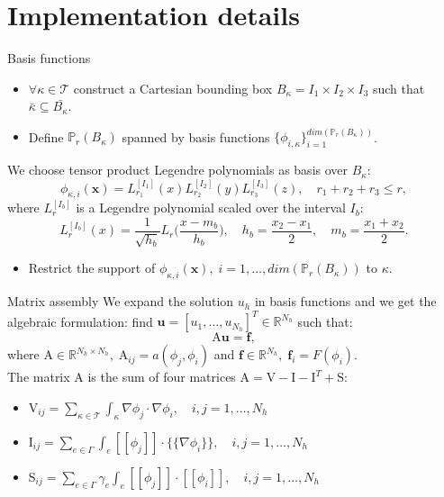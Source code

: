 \documentclass{beamer}
\begin{document}
\section{Implementation details}
\begin{frame}{Basis functions}
	\begin{itemize}
		\item $\forall \kappa \in \mathcal{T}$ construct a Cartesian bounding 
		box $B_\kappa=I_1\times I_2 \times I_3$ such that $\bar{\kappa} \subseteq 
		\bar{B_\kappa}$.
		\pause
		\item Define $\mathbb{P}_r(B_\kappa)$ spanned by basis
		functions $\{ \phi_{i,\kappa} \}_{i=1}^{dim(\mathbb{P}_r(B_\kappa))}$.
	\end{itemize}
	We choose tensor product Legendre polynomials as basis over $B_\kappa$:
	\begin{equation*}
		\phi_{\kappa,i}(\mathbf{x}) =
		L_{r_1}^{[I_1]}(x)L_{r_2}^{[I_2]}(y)L_{r_3}^{[I_3]}(z), \quad
		r_1+r_2+r_3 \leq r,
	\end{equation*}
	where $L_r^{[I_b]}$ is a Legendre polynomial scaled over the interval $I_b$:
	\begin{equation*}
	L_r^{[I_b]} (x) = \frac{1}{\sqrt{h_b}} L_r \bigg( \frac{x-m_b}{h_b} \bigg),
	\quad h_b = \frac{x_2-x_1}{2}, \quad m_b=\frac{x_1+x_2}{2}.
	\end{equation*}
	\pause
	\begin{itemize}
		\item Restrict the support of $\phi_{\kappa, i}(\mathbf{x}), \;
		i=1,\dots,dim(\mathbb{P}_r(B_\kappa))$ to $\kappa$.
	\end{itemize}
\end{frame}
\begin{frame}{Matrix assembly}
	We expand the solution $u_h$ in basis functions and we get the
	algebraic formulation: find $\mathbf{u} = [u_1, \dots, u_{N_h}]^T \in
	\mathbb{R}^{N_h} $ such that:
	\begin{equation*}
	\mathrm{A}\mathbf{u} = \mathbf{f},
	\end{equation*}
	where $\mathrm{A} \in \mathbb{R}^{N_h \times N_h}, \; \mathrm{A}_{ij} =
	a(\phi_j, \phi_i)$ and $\mathbf{f} \in \mathbb{R}^{N_h}, \; \mathbf{f}_i =
	F(\phi_i)$.\\
	\vspace*{0.4cm}
	The matrix $\mathrm{A}$ is the sum of four matrices $\mathrm{A} =
	\mathrm{V} - \mathrm{I} - \mathrm{I}^T + \mathrm{S}$:\\
	\begin{itemize}
		\item $\mathrm{V}_{ij} = \sum\limits_{\kappa \in \mathcal{T}}
		\int_\kappa
		\nabla \phi_j \cdot \nabla \phi_i, \quad i,j=1,\dots,N_h$
		\item $\mathrm{I}_{ij} = \sum\limits_{e \in \Gamma} \int_e
		[\![\phi_j]\!]
		\cdot \{\!\!\{ \nabla \phi_i \}\!\!\}, \quad i,j=1,\dots,N_h$
		\item $\mathrm{S}_{ij} = \sum\limits_{e \in \Gamma} \gamma_e \int_e
		[\![
		\phi_j ]\!] \cdot [\![ \phi_i ]\!], \quad i,j=1,\dots,N_h$
	\end{itemize}
\end{frame}
\end{document}
